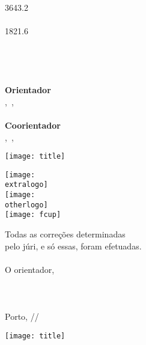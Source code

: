 \documentclass[11pt]{article}
\makeatletter
\newcommand\HUGE{\@setfontsize\Huge{36}{43.2}}
\newcommand\LargeA{\@setfontsize\Large{18}{21.6}}
\newlength{\sidew}
\makeatother
\begin{document}
\pagestyle{empty}
\setlength{\parindent}{0cm}




\hspace{25mm}
\begin{minipage}[b][297mm][t]{125mm}
	\vfill
	\parbox[b][200mm][c]{125mm}{
		\raggedright
		\setstretch{\ttlspcfront}
		{\HUGE \bfseries \frttitle} \\
		 {\large~\\}
		{\LargeA \authr \\}
		{\large \degree \\}
		{\small \deptname \\ \the\year \\}
		{\small~\\}
		{\large \bfseries Orientador \\}
		{\small \supname,~\ifdefined\suppos \suppos,~\fi \supaffil \\}
		{\small~\\}
		\ifdefined\cosupaffilnolink
		{\large \bfseries Coorientador \\}
		{\small \cosupname,~\ifdefined\cosuppos \cosuppos,~\fi \cosupaffil \\}
		\fi
	}
	\vspace{5mm}
\end{minipage}
\hfill
\begin{minipage}[b][297mm][b]{\sidew}
	\texttt{[image: title]}
\end{minipage}

\newpage





\raggedleft
\begin{minipage}[b][297mm][b]{\sidew}
	\ifdefined\extraaffilnolink
		\texttt{[image: \\extralogo]}
		\\[2mm]
	\fi
	\ifdefined\otheraffilnolink
		\texttt{[image: \\otherlogo]}
		\\[2mm]
	\fi
	\texttt{[image: fcup]}

	{ \noindent\footnotesize Todas as correções determinadas \\
		pelo júri, e só essas, foram efetuadas. \\
		\\
		O orientador, \\
		\\
		\\
		\\
		Porto, \underline{\qquad\quad}/\underline{\quad\qquad}/\underline{\qquad\qquad} \\
	}

	\texttt{[image: title]}
\end{minipage}
\end{document}
